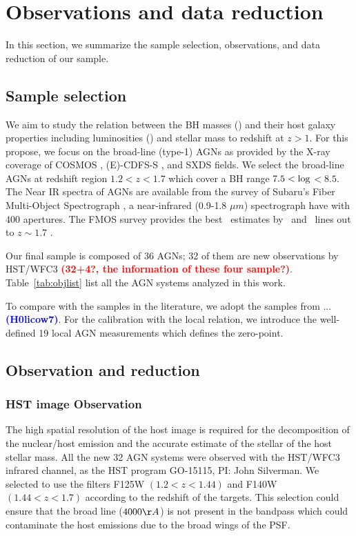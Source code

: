 \documentclass[apj]{emulateapj}
\begin{document}
\section{Observations and data reduction}
\label{sec:data}
In this section, we summarize the sample selection, observations, and data reduction of our sample. 

\subsection{Sample selection}

We aim to study the relation between the BH masses (\mbh) and their host galaxy properties including luminosities (\lhost) and stellar mass to redshift at $z>1$. For this propose, we focus on the broad-line (type-1) AGNs as provided by the X-ray coverage of COSMOS \citep{Civano2016}, (E)-CDFS-S \citep{Lehmer2005, Xue2011}, and SXDS \citep{Ueda2008} fields. We select the broad-line AGNs at redshift region $1.2<z<1.7$ which cover a BH range $7.5<{\rm log}$\mbh $<8.5$. The Near IR spectra of AGNs are available from the survey of Subaru's Fiber Multi-Object Spectrograph \citep[FMOS, ][]{Kimura2010, Schulze2018}, a near-infrared (0.9-1.8 $\mu m$) spectrograph have with 400 apertures. The FMOS survey provides the best \mbh\ estimates by \halpha\ and \hbeta\ lines out to $z\sim1.7$ \citep{Greene2005, Matsuoka2013, Nobuta2012}.

Our final sample is composed of 36  AGNs; 32 of them are new observations by HST/WFC3 \textcolor{red}{\bf (32+4?, the information of these four sample?)}. Table~\ref{tab:objlist} list all the AGN systems analyzed in this work.


To compare with the samples in the literature, we adopt the samples from ... \textcolor{blue}{\bf (H0licow7)}.
For the calibration with the local relation, we introduce the well-defined 19 local AGN measurements \citep{Ben++10, Peterson2004} which defines the zero-point. 

\subsection{Observation and reduction}
\label{observation}
\subsubsection{HST image Observation}
The high spatial resolution of the host image is required for the decomposition of the nuclear/host emission and the accurate estimate of the stellar of the host stellar mass. All the new 32 AGN systems were observed with the HST/WFC3 infrared channel, as the HST program GO-15115, PI: John Silverman. We selected to use the filters F125W $(1.2<z<1.44)$ and F140W $(1.44<z<1.7)$ according to the redshift of the targets. This selection could ensure that the broad \halpha line ($4000\AA$) is not present in the bandpass which could contaminate the host emissions due to the broad wings of the PSF.
\end{document}
